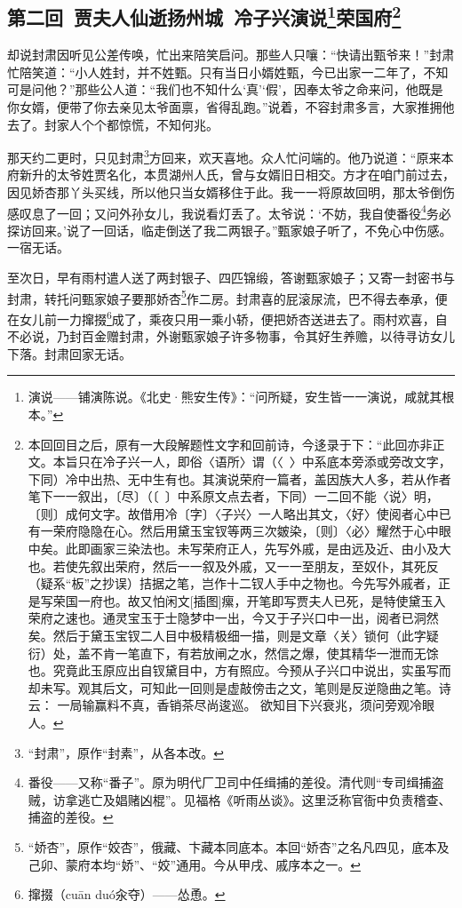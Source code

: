 \subsection*{第二回\ 贾夫人仙逝扬州城\ 冷子兴演说\footnote{演说——铺演陈说。《北史·熊安生传》：“问所疑，安生皆一一演说，咸就其根本。”}荣国府\footnote{本回回目之后，原有一大段解题性文字和回前诗，今迻录于下：“此回亦非正文。本旨只在冷子兴一人，即俗〈语所〉谓（〈\ 〉中系底本旁添或旁改文字，下同）冷中出热、无中生有也。其演说荣府一篇者，盖因族大人多，若从作者笔下一一叙出，〔尽〕（〔\ 〕中系原文点去者，下同）一二回不能〈说〉明，〔则〕成何文字。故借用冷〔字〕〈子兴〉一人略出其文，〈好〉使阅者心中已有一荣府隐隐在心。然后用黛玉宝钗等两三次皴染，〔则〕〈必〉耀然于心中眼中矣。此即画家三染法也。未写荣府正人，先写外戚，是由远及近、由小及大也。若使先叙出荣府，然后一一叙及外戚，又一一至朋友，至奴仆，其死反（疑系“板”之抄误）拮据之笔，岂作十二钗人手中之物也。今先写外戚者，正是写荣国一府也。故又怕闲文[插图]瘰，开笔即写贾夫人已死，是特使黛玉入荣府之速也。通灵宝玉于士隐梦中一出，今又于子兴口中一出，阅者已洞然矣。然后于黛玉宝钗二人目中极精极细一描，则是文章〈关〉锁何（此字疑衍）处，盖不肯一笔直下，有若放闸之水，然信之爆，使其精华一泄而无馀也。究竟此玉原应出自钗黛目中，方有照应。今预从子兴口中说出，实虽写而却未写。观其后文，可知此一回则是虚敲傍击之文，笔则是反逆隐曲之笔。诗云：
一局输赢料不真，香销茶尽尚逡巡。
欲知目下兴衰兆，须问旁观冷眼人。}}
\par 却说封肃因听见公差传唤，忙出来陪笑启问。那些人只嚷：“快请出甄爷来！”封肃忙陪笑道：“小人姓封，并不姓甄。只有当日小婿姓甄，今已出家一二年了，不知可是问他？”那些公人道：“我们也不知什么‘真’‘假’，因奉太爷之命来问，他既是你女婿，便带了你去亲见太爷面禀，省得乱跑。”说着，不容封肃多言，大家推拥他去了。封家人个个都惊慌，不知何兆。
\par 那天约二更时，只见封肃\footnote{“封肃”，原作“封素”，从各本改。}方回来，欢天喜地。众人忙问端的。他乃说道：“原来本府新升的太爷姓贾名化，本贯湖州人氏，曾与女婿旧日相交。方才在咱门前过去，因见娇杏那丫头买线，所以他只当女婿移住于此。我一一将原故回明，那太爷倒伤感叹息了一回；又问外孙女儿，我说看灯丢了。太爷说：‘不妨，我自使番役\footnote{番役——又称“番子”。原为明代厂卫司中任缉捕的差役。清代则“专司缉捕盗贼，访拿逃亡及娼赌凶棍”。见福格《听雨丛谈》。这里泛称官衙中负责稽查、捕盗的差役。}务必探访回来。’说了一回话，临走倒送了我二两银子。”甄家娘子听了，不免心中伤感。一宿无话。
\par 至次日，早有雨村遣人送了两封银子、四匹锦缎，答谢甄家娘子；又寄一封密书与封肃，转托问甄家娘子要那娇杏\footnote{“娇杏”，原作“姣杏”，俄藏、卞藏本同底本。本回“娇杏”之名凡四见，底本及己卯、蒙府本均“娇”、“姣”通用。今从甲戌、戚序本之一。}作二房。封肃喜的屁滚尿流，巴不得去奉承，便在女儿前一力撺掇\footnote{撺掇（cuān duó汆夺）——怂恿。}成了，乘夜只用一乘小轿，便把娇杏送进去了。雨村欢喜，自不必说，乃封百金赠封肃，外谢甄家娘子许多物事，令其好生养赡，以待寻访女儿下落。封肃回家无话。
